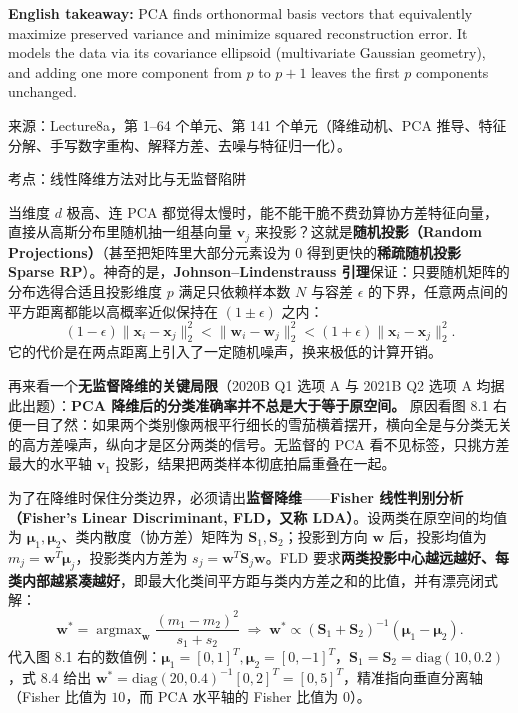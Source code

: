 \textbf{English takeaway:} PCA finds orthonormal basis vectors that equivalently maximize preserved variance and minimize squared reconstruction error. It models the data via its covariance ellipsoid (multivariate Gaussian geometry), and adding one more component from $p$ to $p+1$ leaves the first $p$ components unchanged.

来源：Lecture8a，第 1–64 个单元、第 141 个单元（降维动机、PCA 推导、特征分解、手写数字重构、解释方差、去噪与特征归一化）。



考点：线性降维方法对比与无监督陷阱 


当维度 $d$ 极高、连 PCA 都觉得太慢时，能不能干脆不费劲算协方差特征向量，直接从高斯分布里随机抽一组基向量 $\mathbf{v}_j$ 来投影？这就是\textbf{随机投影（Random Projections）}（甚至把矩阵里大部分元素设为 0 得到更快的\textbf{稀疏随机投影 Sparse RP}）。神奇的是，\textbf{Johnson–Lindenstrauss 引理}保证：只要随机矩阵的分布选得合适且投影维度 $p$ 满足只依赖样本数 $N$ 与容差 $\epsilon$ 的下界，任意两点间的平方距离都能以高概率近似保持在 $(1\pm\epsilon)$ 之内：
\[
(1-\epsilon)\|\mathbf{x}_i - \mathbf{x}_j\|_2^2 < \|\mathbf{w}_i - \mathbf{w}_j\|_2^2 < (1+\epsilon)\|\mathbf{x}_i - \mathbf{x}_j\|_2^2.
\tag{8.3}
\]
它的代价是在两点距离上引入了一定随机噪声，换来极低的计算开销。

再来看一个\textbf{无监督降维的关键局限}（2020B Q1 选项 A 与 2021B Q2 选项 A 均据此出题）：\textbf{PCA 降维后的分类准确率并不总是大于等于原空间。} 原因看图 8.1 右便一目了然：如果两个类别像两根平行细长的雪茄横着摆开，横向全是与分类无关的高方差噪声，纵向才是区分两类的信号。无监督的 PCA 看不见标签，只挑方差最大的水平轴 $\mathbf{v}_1$ 投影，结果把两类样本彻底拍扁重叠在一起。

为了在降维时保住分类边界，必须请出\textbf{监督降维}——\textbf{Fisher 线性判别分析（Fisher's Linear Discriminant, FLD，又称 LDA）}。设两类在原空间的均值为 $\boldsymbol{\mu}_1, \boldsymbol{\mu}_2$、类内散度（协方差）矩阵为 $\mathbf{S}_1, \mathbf{S}_2$；投影到方向 $\mathbf{w}$ 后，投影均值为 $m_j = \mathbf{w}^T\boldsymbol{\mu}_j$，投影类内方差为 $s_j = \mathbf{w}^T\mathbf{S}_j\mathbf{w}$。FLD 要求\textbf{两类投影中心越远越好、每类内部越紧凑越好}，即最大化类间平方距与类内方差之和的比值，并有漂亮闭式解：
\[
\mathbf{w}^* = \mathop{\mathrm{argmax}}_{\mathbf{w}} \frac{(m_1 - m_2)^2}{s_1 + s_2}
\;\Longrightarrow\;
\mathbf{w}^* \propto (\mathbf{S}_1 + \mathbf{S}_2)^{-1}(\boldsymbol{\mu}_1 - \boldsymbol{\mu}_2).
\tag{8.4}
\]
代入图 8.1 右的数值例：$\boldsymbol{\mu}_1=[0,1]^T, \boldsymbol{\mu}_2=[0,-1]^T$，$\mathbf{S}_1=\mathbf{S}_2=\mathrm{diag}(10, 0.2)$，式 8.4 给出 $\mathbf{w}^*=\mathrm{diag}(20,0.4)^{-1}[0,2]^T = [0, 5]^T$，精准指向垂直分离轴（Fisher 比值为 $10$，而 PCA 水平轴的 Fisher 比值为 $0$）。

